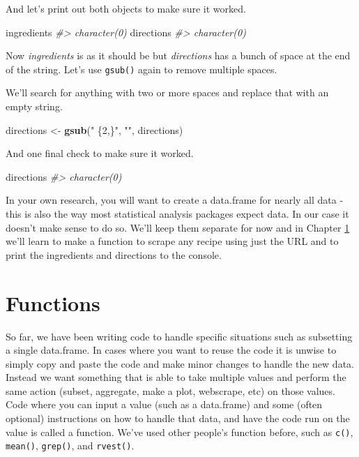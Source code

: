 \documentclass[
  12pt,
]{book}
\newenvironment{Shaded}{\begin{snugshade}}{\end{snugshade}}
\newcommand{\CommentTok}[1]{\textcolor[rgb]{0.37,0.37,0.37}{\textit{#1}}}
\newcommand{\KeywordTok}[1]{\textcolor[rgb]{0.27,0.27,0.27}{\textbf{#1}}}
\newcommand{\NormalTok}[1]{#1}
\newcommand{\StringTok}[1]{\textcolor[rgb]{0.5,0.5,0.5}{#1}}
\begin{document}
And let's print out both objects to make sure it worked.

\begin{Shaded}
\begin{Highlighting}[]
\NormalTok{ingredients}
\CommentTok{\#> character(0)}
\NormalTok{directions}
\CommentTok{\#> character(0)}
\end{Highlighting}
\end{Shaded}

Now \emph{ingredients} is as it should be but \emph{directions} has a bunch of space at the end of the string. Let's use \texttt{gsub()} again to remove multiple spaces.

We'll search for anything with two or more spaces and replace that with an empty string.

\begin{Shaded}
\begin{Highlighting}[]
\NormalTok{directions <{-}}\StringTok{ }\KeywordTok{gsub}\NormalTok{(}\StringTok{" \{2,\}"}\NormalTok{, }\StringTok{""}\NormalTok{, directions)}
\end{Highlighting}
\end{Shaded}

And one final check to make sure it worked.

\begin{Shaded}
\begin{Highlighting}[]
\NormalTok{directions}
\CommentTok{\#> character(0)}
\end{Highlighting}
\end{Shaded}

In your own research, you will want to create a data.frame for nearly all data - this is also the way most statistical analysis packages expect data. In our case it doesn't make sense to do so. We'll keep them separate for now and in Chapter \ref{functions} we'll learn to make a function to scrape any recipe using just the URL and to print the ingredients and directions to the console.

\hypertarget{functions}{%
\chapter{Functions}\label{functions}}

So far, we have been writing code to handle specific situations such as subsetting a single data.frame. In cases where you want to reuse the code it is unwise to simply copy and paste the code and make minor changes to handle the new data. Instead we want something that is able to take multiple values and perform the same action (subset, aggregate, make a plot, webscrape, etc) on those values. Code where you can input a value (such as a data.frame) and some (often optional) instructions on how to handle that data, and have the code run on the value is called a function. We've used other people's function before, such as \texttt{c()}, \texttt{mean()}, \texttt{grep()}, and \texttt{rvest()}.
\end{document}
